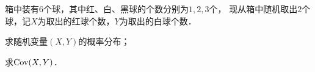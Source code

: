 \documentclass[plain,noanswer,medmath]{../../template/jnuexam}
\begin{document}






\begin{problem}[points=11]
箱中装有$6$个球，其中红、白、黑球的个数分别为$1,2,3$个，
现从箱中随机取出$2$个球，记$X$为取出的红球个数，$Y$为取出的白球个数．\par
\begin{enumerate*}
\item 求随机变量$(X,Y)$的概率分布； 
\item 求$\operatorname{Cov} (X,Y)$．
\end{enumerate*}
\end{problem}
\end{document}
